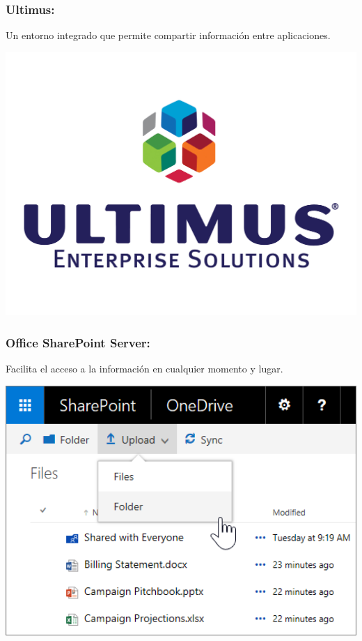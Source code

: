 \subsubsection{Ultimus: }\label{sec:nada2}  
Un entorno integrado que permite compartir información entre aplicaciones.
	\begin{center}
	\includegraphics[width=15cm]{./Imagenes/BIimagen4}
	\end{center}
	
\subsubsection{Office SharePoint Server: }\label{sec:nada2}  
Facilita el acceso a la información en cualquier momento y lugar.
	\begin{center}
	\includegraphics[width=15cm]{./Imagenes/BIimagen5}
	\end{center}
	
